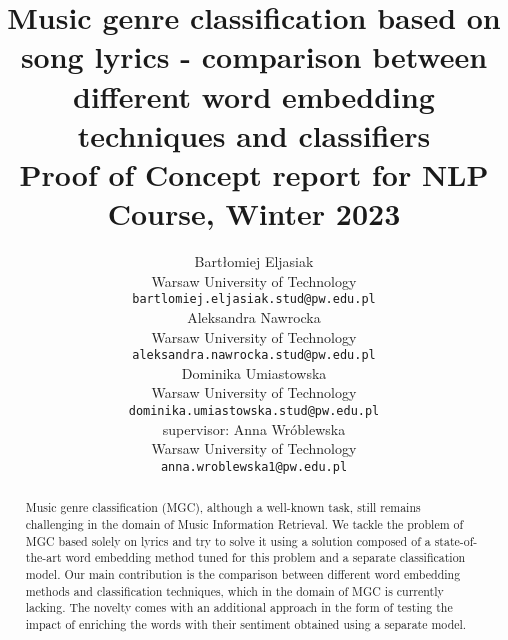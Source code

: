 \documentclass[11pt]{article}
\title{Music genre classification based on song lyrics - comparison between different word embedding techniques and classifiers \\Proof of Concept report for NLP Course, Winter 2023}
\author{Bartłomiej Eljasiak \\
  Warsaw University of Technology \\
  {\tt\small bartlomiej.eljasiak.stud@pw.edu.pl} \\\And
  Aleksandra Nawrocka \\
  Warsaw University of Technology \\
  {\tt\small aleksandra.nawrocka.stud@pw.edu.pl} \\
  \AND
  Dominika Umiastowska \\
  Warsaw University of Technology \\
  {\tt\small dominika.umiastowska.stud@pw.edu.pl} \\\And 
  supervisor: Anna Wróblewska\\
  Warsaw University of Technology \\
  {\tt\small anna.wroblewska1@pw.edu.pl}\\}
\date{}
\begin{document}
\raggedbottom

\maketitle

\vspace{5em}

\begin{abstract}
Music genre classification (MGC), although a well-known task, still remains challenging in the domain of Music Information Retrieval. We tackle the problem of MGC based solely on lyrics and try to solve it using a solution composed of a state-of-the-art word embedding method tuned for this problem and a separate classification model. Our main contribution is the comparison between different word embedding methods and classification techniques, which in the domain of MGC is currently lacking. The novelty comes with an additional approach in the form of testing the impact of enriching the words with their sentiment obtained using a separate model.
\end{abstract}









\printbibliography
\end{document}
